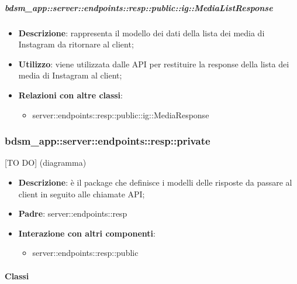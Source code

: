     \subparagraph{bdsm\_app::server::endpoints::resp::public::ig::MediaListResponse} %
    \label{subp:bdsm_app_server_endpoints_resp_public_ig_medialistresponse}
    \begin{itemize}
      \item \textbf{Descrizione}: rappresenta il modello dei dati della lista dei media di Instagram da ritornare al client;
      \item \textbf{Utilizzo}: viene utilizzata dalle API per restituire la response della lista dei media di Instagram al client;
      \item \textbf{Relazioni con altre classi}:
        \begin{itemize}
          \item server::endpoints::resp::public::ig::MediaResponse
        \end{itemize}
      \end{itemize}

\subsubsection{bdsm\_app::server::endpoints::resp::private} %
\label{ssub:bdsm_app_server_endpoints_resp_private}
[TO DO] (diagramma) \newline \newline

\begin{itemize}
  \item \textbf{Descrizione}: è il package che definisce i modelli delle risposte da passare al client in seguito alle chiamate API;
  \item \textbf{Padre}: server::endpoints::resp
  \item \textbf{Interazione con altri componenti}:
  	\begin{itemize}
  		\item server::endpoints::resp::public
	\end{itemize}
\end{itemize}

	\paragraph{Classi} %

